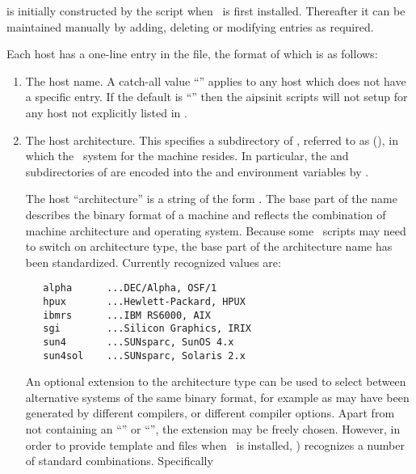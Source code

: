  is initially constructed by the  script
when \aipspp\ is first installed.  Thereafter it can be maintained manually by
adding, deleting or modifying entries as required.

Each host has a one-line entry in the  file, the format of
which is as follows:

\begin{enumerate}
\item
   The host name.  A catch-all value ``'' applies to any host
   which does not have a specific entry. If the default is ``''
   then the aipsinit scripts will not setup  for any host
   not explicitly listed in .

\item
   The host architecture.  This specifies a subdirectory of ,
   referred to as  (), in which the \aipspp\ 
   system for the machine resides.  In particular, the  and
   \file{doc} subdirectories of \file{\$AIPSARCH} are encoded into the
   \code{PATH} and \code{MANPATH} environment variables by .

   The host ``architecture'' is a string of the form .
   The base part of the name describes the binary format of a machine and
   reflects the combination of machine architecture and operating system.
   Because some \aipspp\ scripts may need to switch on architecture type,
   the base part of the architecture name has been standardized.  Currently
   recognized values are:

\begin{verbatim}
   alpha      ...DEC/Alpha, OSF/1
   hpux       ...Hewlett-Packard, HPUX
   ibmrs      ...IBM RS6000, AIX
   sgi        ...Silicon Graphics, IRIX
   sun4       ...SUNsparc, SunOS 4.x
   sun4sol    ...SUNsparc, Solaris 2.x
\end{verbatim}

   \noindent
   An optional extension to the architecture type can be used to select
   between alternative systems of the same binary format, for example as may
   have been generated by different compilers, or different compiler options.
   Apart from not containing an ``\code{\_}'' or ``\code{:}'', the extension
   may be freely chosen.  However, in order to provide template
    and  files when \aipspp\ is installed,
   \exeref{configure}) recognizes a number of standard combinations.
   Specifically


\end{enumerate}
